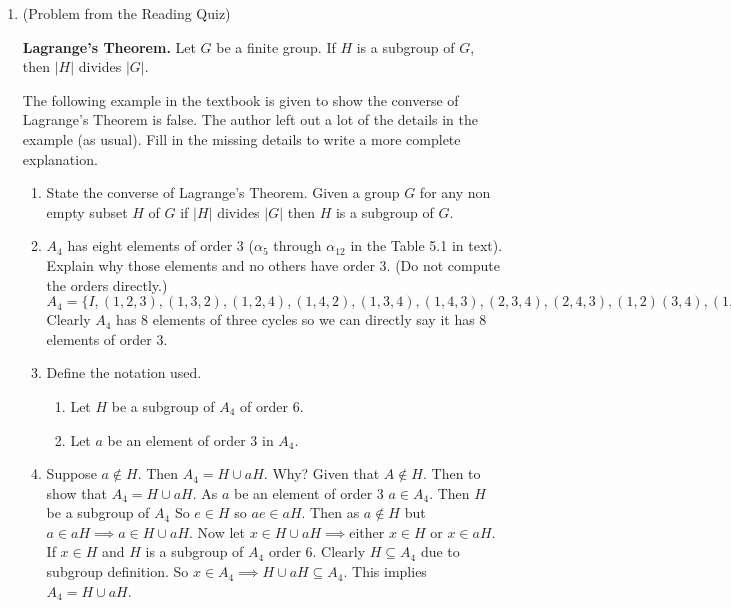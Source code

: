 \documentclass{article}
\begin{document}


\begin{enumerate}
\item (Problem from the Reading Quiz) 
    
\textbf{Lagrange's Theorem.} Let $G$ be a finite group. If $H$ is a subgroup of $G$, then $|H|$ divides $|G|$.

The following example in the textbook is given to show the converse of Lagrange's Theorem is false. 
The author left out a lot of the details in the example (as usual). Fill in the missing details to write a more complete explanation. 
\begin{enumerate}
\item State the converse of Lagrange's Theorem. Given a group $G$ for any non empty subset $H$ of $G$ if $|H|$ divides $|G|$ then $H$ is a subgroup of $G$.

\item $A_4$ has eight elements of order 3 ($\alpha_5$ through $\alpha_{12}$ in the Table 5.1 in text).
Explain why those elements and no others have order 3. (Do not compute the orders directly.)  $A_4 = \{I,(1,2,3),(1,3,2),(1,2,4),(1,4,2),(1,3,4),(1,4,3),(2,3,4),(2,4,3),(1,2)(3,4),(1,3)(2,4),(1,4)(2,3)\}$ Clearly $A_4$ has 8 elements of three cycles so we can directly say it has 8 elements of order 3.

\item Define the notation used.
\begin{enumerate}
    
    \item Let $H$ be a subgroup of $A_4$ of order 6. 
    
    \item Let $a$ be an element of order 3 in $A_4$. 

\end{enumerate}

\item Suppose $a\not\in H$. Then $A_4=H\cup aH$. Why? Given that $A \not \in H$. Then to show that $A_4 = H\cup aH$. As $a$ be an element of order 3 $a \in A_4$. Then $H$ be a subgroup of $A_4$ So $e \in H$ so $ae \in a H$. Then as $a \not \in H$ but $a \in aH \implies a \in H \cup aH$. Now let $x \in H \cup aH \implies $either $x \in H$ or $x\in aH$. If $x \in H$ and $H$ is a subgroup of $A_4$ order 6. Clearly $H \subseteq A_4$ due to subgroup definition. So $x \in A_4 \implies H \cup aH \subseteq A_4$. This implies $A_4 = H \cup aH$.


\end{enumerate}
\end{enumerate}
\end{document}
